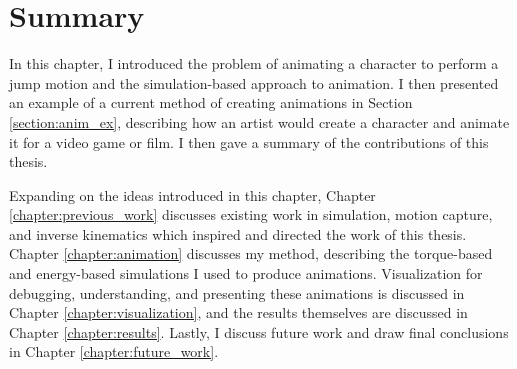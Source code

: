 \section{Summary}
\label{section:intro_summary}
In this chapter, I introduced the problem of animating a character to perform a jump motion and the simulation-based approach to animation.  I then presented an example of a current method of creating animations in Section \ref{section:anim_ex}, describing how an artist would create a character and animate it for a video game or film.  I then gave a summary of the contributions of this thesis.

Expanding on the ideas introduced in this chapter, Chapter \ref{chapter:previous_work} discusses existing work in simulation, motion capture, and inverse kinematics which inspired and directed the work of this thesis.  Chapter \ref{chapter:animation} discusses my method, describing the torque-based and energy-based simulations I used to produce animations.  Visualization for debugging, understanding, and presenting these animations is discussed in Chapter \ref{chapter:visualization}, and the results themselves are discussed in Chapter \ref{chapter:results}. Lastly, I discuss future work and draw final conclusions in Chapter \ref{chapter:future_work}.